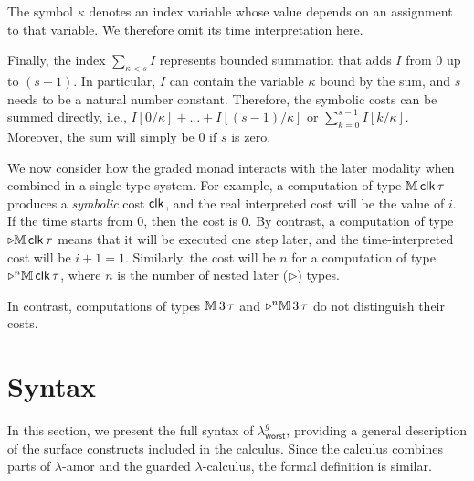 The symbol $\kappa$ denotes an index variable whose value depends on an assignment to that variable. We therefore omit its time interpretation here.

Finally, the index $\textstyle\sum_{\kappa<s} I$ represents bounded summation that adds $I$ 
from $0$ up to $(s - 1)$. In particular, $I$ can contain the variable $\kappa$ bound by the sum, and $s$ needs to be a natural number constant. Therefore, the symbolic costs can be summed directly, 
i.e., $I[0/\kappa] + \ldots + I[(s-1)/\kappa]$ or $\sum_{k=0}^{s-1}I[k/\kappa]$.
Moreover, the sum will simply be $0$ if $s$ is zero.

We now consider how the graded monad interacts with the later modality when combined in a single type system.
For example, a computation of type $\mathbb{M}\,{\mathsf{clk}}\, \tau$ produces a \emph{symbolic} cost $\mathsf{clk}$, and the real interpreted cost will be the value of 
$i$. If the time starts from 0, then the cost is 0. By contrast, a computation of type $\triangleright\mathbb{M}\,{\mathsf{clk}}\, \tau$ means that it
will be executed one step later, and the time-interpreted cost will be $i+1 = 1$. 
Similarly, the cost will be $n$ for a computation of type $\triangleright^n \mathbb{M}\,{\mathsf{clk}}\, \tau$, where $n$ is the number of nested later ($\triangleright$) types. 

In contrast, computations of types $\mathbb{M}\,{3}\, \tau$ and $\triangleright^n \mathbb{M}\,{3}\, \tau$ do not distinguish their costs.

\FloatBarrier

\section{Syntax}
\label{sec:worst-case-syntax}
In this section, we present the full syntax of $\lambda^g_{\mathsf{worst}}$, providing a general description of the surface constructs included in the calculus.
Since the calculus combines parts of $\lambda$-amor and the guarded $\lambda$-calculus, the formal definition is similar.

